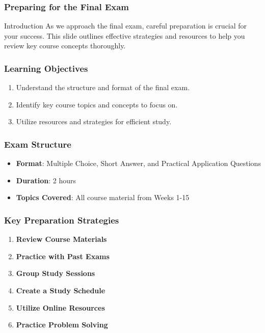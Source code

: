 \documentclass[aspectratio=169]{beamer}
\begin{document}
\begin{frame}
    \frametitle{Preparing for the Final Exam}
    \begin{block}{Introduction}
        As we approach the final exam, careful preparation is crucial for your success. This slide outlines effective strategies and resources to help you review key course concepts thoroughly.
    \end{block}
\end{frame}

\begin{frame}
    \frametitle{Learning Objectives}
    \begin{enumerate}
        \item Understand the structure and format of the final exam.
        \item Identify key course topics and concepts to focus on.
        \item Utilize resources and strategies for efficient study.
    \end{enumerate}
\end{frame}

\begin{frame}
    \frametitle{Exam Structure}
    \begin{itemize}
        \item \textbf{Format}: Multiple Choice, Short Answer, and Practical Application Questions
        \item \textbf{Duration}: 2 hours
        \item \textbf{Topics Covered}: All course material from Weeks 1-15
    \end{itemize}
\end{frame}

\begin{frame}
    \frametitle{Key Preparation Strategies}
    \begin{enumerate}
        \item \textbf{Review Course Materials}
        \item \textbf{Practice with Past Exams}
        \item \textbf{Group Study Sessions}
        \item \textbf{Create a Study Schedule}
        \item \textbf{Utilize Online Resources}
        \item \textbf{Practice Problem Solving}
    \end{enumerate}
\end{frame}
\end{document}
